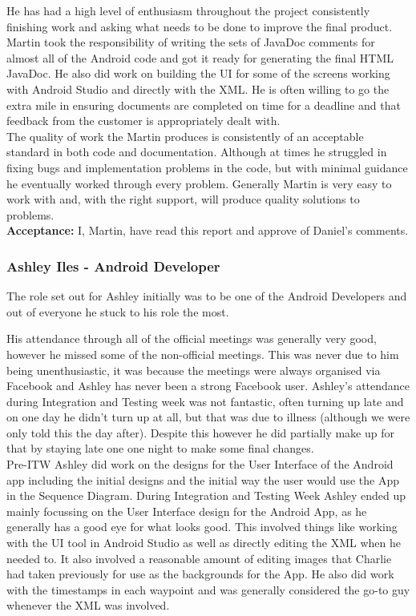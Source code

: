 \documentclass{article}
\begin{document}
		He has had a high level of enthusiasm throughout the project consistently finishing work and asking what needs to be done to improve the final product. Martin took the responsibility of writing the sets of JavaDoc comments for almost all of the Android code and got it ready for generating the final HTML JavaDoc. He also did work on building the UI for some of the screens working with Android Studio and directly with the XML. He is often willing to go the extra mile in ensuring documents are completed on time for a deadline and that feedback from the customer is appropriately dealt with. \\
		
		The quality of work the Martin produces is consistently of an acceptable standard in both code and documentation. Although at times he struggled in fixing bugs and implementation problems in the code, but with minimal guidance he eventually worked through every problem. Generally Martin is very easy to work with and, with the right support, will produce quality solutions to problems. \\
		
{\bf Acceptance:} I, Martin, have read this report and approve of Daniel's comments.


		\subsubsection{Ashley Iles - Android Developer}
		The role set out for Ashley initially was to be one of the Android Developers and out of everyone he stuck to his role the most.
		
		His attendance through all of the official meetings was generally very good, however he missed some of the non-official meetings. This was never due to him being unenthusiastic, it was because the meetings were always organised via Facebook and Ashley has never been a strong Facebook user. Ashley's attendance during Integration and Testing week was not fantastic, often turning up late and on one day he didn't turn up at all, but that was due to illness (although we were only told this the day after). Despite this however he did partially make up for that by staying late one one night to make some final changes. \\
		
		Pre-ITW Ashley did work on the designs for the User Interface of the Android app including the initial designs and the initial way the user would use the App in the Sequence Diagram. During Integration and Testing Week Ashley ended up mainly focussing on the User Interface design for the Android App, as he generally has a good eye for what looks good. This involved things like working with the UI tool in Android Studio as well as directly editing the XML when he needed to. It also involved a reasonable amount of editing images that Charlie had taken previously for use as the backgrounds for the App. He also did work with the timestamps in each waypoint and was generally considered the go-to guy whenever the XML was involved. \\
		
\end{document}
